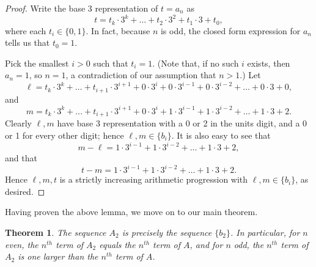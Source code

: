 \documentclass[11pt,letterpaper,twoside,english]{article}
\theoremstyle{theorem}
\newtheorem{theorem}{Theorem}
\theoremstyle{remark}
\begin{document}
\begin{proof}
Write the base 3 representation of $t=a_n$ as 
\[t=t_k\cdot 3^k+\ldots + t_2\cdot 3^2 + t_1\cdot 3 + t_0,\] where each $t_i\in \{0, 1\}$. In fact, because $n$ is odd, the closed form expression for $a_n$ tells us that $t_0=1$.

Pick the smallest $i>0$ such that $t_i=1$. (Note that, if no such $i$ exists, then $a_n=1$, so $n=1$, a contradiction of our assumption that $n>1$.) Let 
\[\ell=t_k\cdot 3^k + \ldots + t_{i+1}\cdot 3^{i+1} + 0\cdot 3^i + 0\cdot 3^{i-1} + 0\cdot 3^{i-2} + \ldots + 0 \cdot 3+ 0,\]
and 
\[m=t_k\cdot 3^k + \ldots + t_{i+1}\cdot 3^{i+1} + 0\cdot 3^i + 1\cdot 3^{i-1} + 1\cdot 3^{i-2} + \ldots + 1 \cdot 3+ 2.\]
Clearly $\ell, m$ have base 3 representation with a 0 or 2 in the units digit, and a 0 or 1 for every other digit; hence $\ell, m\in \{b_i\}$. It is also easy to see that
\[m-\ell=1\cdot 3^{i-1}+1\cdot 3^{i-2}+\ldots + 1\cdot 3 + 2,\]
and that
\[t-m=1\cdot 3^{i-1}+1\cdot 3^{i-2}+\ldots + 1\cdot 3 + 2.\]
Hence $\ell, m, t$ is a strictly increasing arithmetic progression with $\ell, m\in \{b_i\}$, as desired.
\end{proof}

Having proven the above lemma, we move on to our main theorem.

\begin{theorem} \label{thm:A_2}
The sequence $A_2$ is precisely the sequence $\{b_2\}$. In particular, for $n$ even, the $n^{th}$ term of $A_2$ equals the $n^{th}$ term of $A$, and for $n$ odd, the $n^{th}$ term of $A_2$ is one larger than the $n^{th}$ term of $A$.
\end{theorem}
\end{document}
